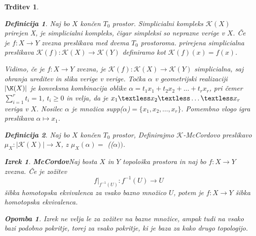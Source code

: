\documentclass[a4paper,12pt]{article}
\theoremstyle{definition}
\newtheorem{definicija}{Definicija}
\theoremstyle{plain}
\newtheorem{izrek}{Izrek}
\theoremstyle{definition}
\theoremstyle{plain}
\newtheorem{trditev}{Trditev}
\theoremstyle{plain}
\theoremstyle{plain}
\newtheorem{opomba}{Opomba}
\theoremstyle{plain}
\begin{document}
\begin{trditev}
\begin{definicija}
    Naj bo $X$ končen $T_0$ prostor. \textit{Simplicialni kompleks} $\mathcal{K}(X)$ \textit{prirejen X}, je simplicialni kompleks, čigar simpleksi so neprazne verige v $X$. Če je $f: X\rightarrow Y$ zvezna preslikava med dvema $T_0$ prostoroma. \textit{prirejena simplicialna preslikava} $\mathcal{K}(f):\mathcal{K}(X) \rightarrow \mathcal{K}(Y)$ definiramo kot $\mathcal{K}(f)(x) = f(x)$.
\end{definicija}
Vidimo, če je $f: X\rightarrow Y$ zvezna, je $\mathcal{K}(f):\mathcal{K}(X) \rightarrow \mathcal{K}(Y)$ simplicialna, saj ohranja ureditev in slika verige v verige.
Točka $\alpha$ v geometrijski realizaciji $|\K(X)|$ je
konveksna kombinacija oblike
$\alpha = t_1x_1+t_2x_2 + \ldots + t_r x_r$, pri čemer 
$\sum_{i=1}^{r}t_i=1$, $t_i \ge 0$ in 
velja, da je $x_1 \textless x_2 \textless \ldots \textless x_r$ veriga v $X$.
Nosilec $\alpha$ je množica supp($\alpha$)$= \{x_1,x_2,\ldots,x_r\}$. Pomembno vlogo igra 
 preslikava $\alpha \mapsto x_1$.
 
 \begin{definicija}
    Naj bo $X$ končen $T_0$ prostor, Definirajmo
    $\mathcal{K}$-\textit{McCordovo} preslikavo $\mu_X:|\mathcal{K}
    (X)|\rightarrow X$, z $\mu_X(\alpha) =$
    (($\alpha))$.
\end{definicija}



\begin{izrek}{\textbf{McCordov}}\label{iz:mccord}
    Naj bosta $X$ in $Y$ topološka prostora in naj bo $f:X\rightarrow Y$ zvezna. Če je zožitev
    $$
    f|_{f^{-1}(U)}:f^{-1}(U)\rightarrow U
    $$
    šibka homotopska ekvivalenca za vsako bazno množico $U$, potem je $f:X\rightarrow Y$  šibka homotopska ekvivalenca.
\end{izrek}

\begin{opomba}
    Izrek ne velja le za zožitev na bazne množice, ampak tudi na vsako \textit{bazi podobno pokritje}, torej za vsako pokritje, ki je baza za kako drugo topologijo.
\end{opomba}




\end{trditev}
\end{document}
